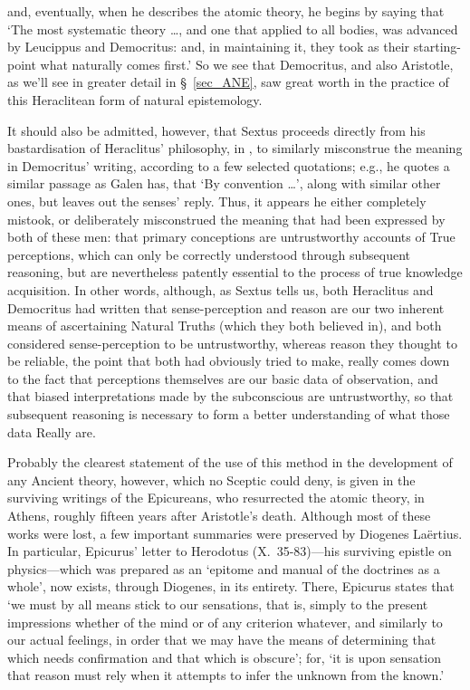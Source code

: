 and, eventually, when he describes the atomic theory, he begins by saying that `The most systematic theory \ldots, and one that applied to all bodies, was advanced by Leucippus and Democritus: and, in maintaining it, they took as their starting-point what naturally comes first.' So we see that Democritus, and also Aristotle, as we'll see in greater detail in \S~\ref{sec_ANE}, saw great worth in the practice of this Heraclitean form of natural epistemology.

It should also be admitted, however, that Sextus proceeds directly from his bastardisation of Heraclitus' philosophy, in \cite{Sextus2005}, to similarly misconstrue the meaning in Democritus' writing, according to a few selected quotations; e.g., he quotes a similar passage as Galen has, that `By convention \ldots', along with similar other ones, but leaves out the senses' reply. Thus, it appears he either completely mistook, or deliberately misconstrued the meaning that had been expressed by both of these men: that primary conceptions are untrustworthy accounts of True perceptions, which can only be correctly understood through subsequent reasoning, but are nevertheless patently essential to the process of true knowledge acquisition. In other words, although, as Sextus tells us, both Heraclitus and Democritus had written that sense-perception and reason are our two inherent means of ascertaining Natural Truths (which they both believed in), and both considered sense-perception to be untrustworthy, whereas reason they thought to be reliable, the point that both had obviously tried to make, really comes down to the fact that perceptions themselves are our basic data of observation, and that biased interpretations made by the subconscious are untrustworthy, so that subsequent reasoning is necessary to form a better understanding of what those data Really are. 

Probably the clearest statement of the use of this method in the development of any Ancient theory, however, which no Sceptic could deny, is given in the surviving writings of the Epicureans, who resurrected the atomic theory, in Athens, roughly fifteen years after Aristotle's death. Although most of these works were lost, a few important summaries were preserved by Diogenes La\"{e}rtius. In particular, Epicurus' letter to Herodotus \cite{Diogenes1931} (X.~35-83)---his surviving epistle on physics---which was prepared as an `epitome and manual of the doctrines as a whole', now exists, through Diogenes, in its entirety. There, Epicurus states that `we must by all means stick to our sensations, that is, simply to the present impressions whether of the mind or of any criterion whatever, and similarly to our actual feelings, in order that we may have the means of determining that which needs confirmation and that which is obscure'; for, `it is upon sensation that reason must rely when it attempts to infer the unknown from the known.'

